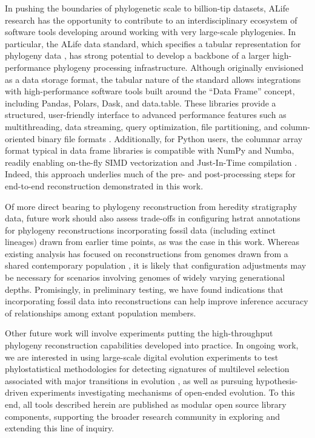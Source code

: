 In pushing the boundaries of phylogenetic scale to billion-tip datasets, ALife research has the opportunity to contribute to an interdisciplinary ecosystem of software tools developing around working with very large-scale phylogenies.
In particular, the ALife data standard, which specifies a tabular representation for phylogeny data \citep{Lalejini2019data}, has strong potential to develop a backbone of a larger high-performance phylogeny processing infrastructure.
Although originally envisioned as a data storage format, the tabular nature of the standard allows integrations with high-performance software tools built around the ``Data Frame'' concept, including Pandas, Polars, Dask, and data.table.
These libraries provide a structured, user-friendly interface to advanced performance features such as multithreading, data streaming, query optimization, file partitioning, and column-oriented binary file formats \citep{mckinney2010data,datatable,vink2024polars,rocklin2015dask}.
Additionally, for Python users, the columnar array format typical in data frame libraries is compatible with NumPy and Numba, readily enabling on-the-fly SIMD vectorization and Just-In-Time compilation \citep{harris2020array,lam2015numba}.
Indeed, this approach underlies much of the pre- and post-processing steps for end-to-end reconstruction demonstrated in this work.

Of more direct bearing to phylogeny reconstruction from heredity stratigraphy data, future work should also assess trade-offs in configuring hstrat annotations for phylogeny reconstructions incorporating fossil data (including extinct lineages) drawn from earlier time points, as was the case in this work.
Whereas existing analysis has focused on reconstructions from genomes drawn from a shared contemporary population \citep{moreno2025testing}, it is likely that configuration adjustments may be necessary for scenarios involving genomes of widely varying generational depths.
Promisingly, in preliminary testing, we have found indications that incorporating fossil data into reconstructions can help improve inference accuracy of relationships among extant population members.

Other future work will involve experiments putting the high-throughput phylogeny reconstruction capabilities developed into practice.
In ongoing work, we are interested in using large-scale digital evolution experiments to test phylostatistical methodologies for detecting signatures of multilevel selection associated with major transitions in evolution \citep{BonettiFranceschi2024}, as well as pursuing hypothesis-driven experiments investigating mechanisms of open-ended evolution.
To this end, all tools described herein are published as modular open source library components, supporting the broader research community in exploring and extending this line of inquiry.

